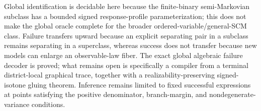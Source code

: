 Global identification is decidable here because the finite-binary semi-Markovian subclass has a bounded signed response-profile parameterization; this does not make the global oracle complete for the broader ordered-variable/general-SCM class.  Failure transfers upward because an explicit separating pair in a subclass remains separating in a superclass, whereas success does not transfer because new models can enlarge an observable-law fiber.  The exact global algebraic failure decoder is proved; what remains open is specifically a compiler from a terminal district-local graphical trace, together with a realizability-preserving signed-isotone gluing theorem.  Inference remains limited to fixed successful expressions at points satisfying the positive denominator, branch-margin, and nondegenerate-variance conditions.